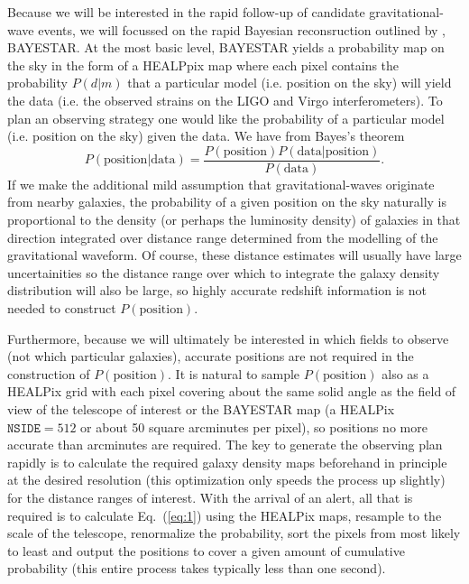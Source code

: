 \documentclass[useAMS,usenatbib]{mn2e}
\begin{document}
Because we will be interested in the rapid follow-up of candidate
gravitational-wave events, we will focussed on the rapid Bayesian
reconsruction outlined by \citet{2015arXiv150803634S}, BAYESTAR.  At
the most basic level, BAYESTAR yields a probability map on the sky in
the form of a HEALPpix map \citep{2005ApJ...622..759G} where each
pixel contains the probability $P(d|m)$ that a particular model
(i.e. position on the sky) will yield the data (i.e. the observed
strains on the LIGO and Virgo interferometers).  To plan an observing
strategy one would like the probability of a particular model
(i.e. position on the sky) given the data.  We have from Bayes's
theorem
\begin{equation}
  P(\mathrm{position}|\mathrm{data}) = \frac{P(\mathrm{position})
    P(\mathrm{data}|\mathrm{position})}{P(\mathrm{data})}.
  \label{eq:1}
\end{equation}
If we make the additional mild assumption that gravitational-waves
originate from nearby galaxies, the probability of a given position on
the sky naturally is proportional to the density (or perhaps the
luminosity density) of galaxies in that direction integrated over
distance range determined from the modelling of the gravitational
waveform.  Of course, these distance estimates will usually have large
uncertainities so the distance range over which to integrate the
galaxy density distribution will also be large, so highly accurate
redshift information is not needed to construct
$P(\mathrm{position})$.

Furthermore, because we will ultimately be interested in which fields
to observe (not which particular galaxies), accurate positions are not
required in the construction of $P(\mathrm{position})$. It is natural
to sample $P(\mathrm{position})$ also as a HEALPix grid with each pixel
covering about the same solid angle as the field of view of the
telescope of interest or the BAYESTAR map (a HEALPix $\mathtt{NSIDE}=512$ or
about 50 square arcminutes per pixel), so positions no more accurate
than arcminutes are required.  The key to generate the observing plan
rapidly is to calculate the required galaxy density maps beforehand in
principle at the desired resolution (this optimization only speeds the
process up slightly) for the distance ranges of interest.  With the
arrival of an alert, all that is required is to calculate
Eq.~(\ref{eq:1}) using the HEALPix maps, resample to the scale of the
telescope, renormalize the probability, sort the pixels from most
likely to least and output the positions to cover a given amount of
cumulative probability (this entire process takes typically less than
one second).
\end{document}
